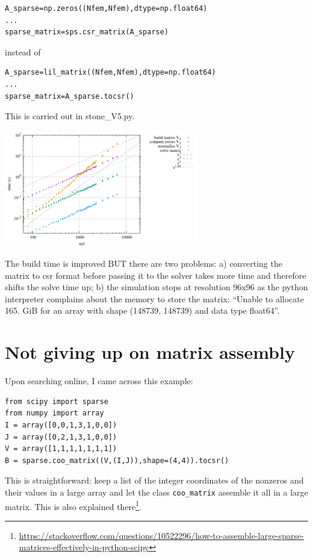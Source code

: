 \begin{lstlisting}
A_sparse=np.zeros((Nfem,Nfem),dtype=np.float64)
...
sparse_matrix=sps.csr_matrix(A_sparse)
\end{lstlisting}
instead of 
\begin{lstlisting}
A_sparse=lil_matrix((Nfem,Nfem),dtype=np.float64)
...
sparse_matrix=A_sparse.tocsr()
\end{lstlisting}
This is carried out in {\pythonfile stone\_V5.py}. 
\begin{center}
\includegraphics[width=8.5cm]{python_codes/fieldstone_150/results/times_V5}
\end{center}
The build time is improved BUT there are two problems: a) converting the matrix to csr 
format before passing it to the solver takes more time and therefore shifts the solve
time up; b) the simulation stops at resolution 96x96 as the python interpreter complains 
about the memory to store the matrix:
``Unable to allocate 165. GiB for an array with shape (148739, 148739) and data type float64''.

\section*{Not giving up on matrix assembly}

Upon searching online, I came across this example:

\begin{lstlisting}
from scipy import sparse
from numpy import array
I = array([0,0,1,3,1,0,0])
J = array([0,2,1,3,1,0,0])
V = array([1,1,1,1,1,1,1])
B = sparse.coo_matrix((V,(I,J)),shape=(4,4)).tocsr()
\end{lstlisting}
This is straightforward: keep a list of the integer coordinates of the nonzeros and their values
in a large array and let the class {\tt coo\_matrix} assemble it all in a large matrix.
This is also explained there\footnote{\url{https://stackoverflow.com/questions/10522296/how-to-assemble-large-sparse-matrices-effectively-in-python-scipy}}.

